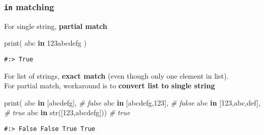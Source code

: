 \documentclass[
]{book}
\newenvironment{Shaded}{\begin{snugshade}}{\end{snugshade}}
\newcommand{\BuiltInTok}[1]{#1}
\newcommand{\CommentTok}[1]{\textcolor[rgb]{0.37,0.37,0.37}{\textit{#1}}}
\newcommand{\KeywordTok}[1]{\textcolor[rgb]{0.27,0.27,0.27}{\textbf{#1}}}
\newcommand{\NormalTok}[1]{#1}
\newcommand{\StringTok}[1]{\textcolor[rgb]{0.5,0.5,0.5}{#1}}
\begin{document}
\hypertarget{in-matching}{%
\subsubsection{\texorpdfstring{\texttt{in} matching}{in matching}}\label{in-matching}}

For single string, \textbf{partial match}

\begin{Shaded}
\begin{Highlighting}[]
\BuiltInTok{print}\NormalTok{( }\StringTok{\textquotesingle{}abc\textquotesingle{}} \KeywordTok{in} \StringTok{\textquotesingle{}123abcdefg\textquotesingle{}}\NormalTok{ )}
\end{Highlighting}
\end{Shaded}

\begin{verbatim}
#:> True
\end{verbatim}

For list of strings, \textbf{exact match} (even though only one element in list).\\
For partial match, workaround is to \textbf{convert list to single string}

\begin{Shaded}
\begin{Highlighting}[]
\BuiltInTok{print}\NormalTok{( }\StringTok{\textquotesingle{}abc\textquotesingle{}} \KeywordTok{in}\NormalTok{ [}\StringTok{\textquotesingle{}abcdefg\textquotesingle{}}\NormalTok{],             }\CommentTok{\# false}
       \StringTok{\textquotesingle{}abc\textquotesingle{}} \KeywordTok{in}\NormalTok{ [}\StringTok{\textquotesingle{}abcdefg\textquotesingle{}}\NormalTok{,}\StringTok{\textquotesingle{}123\textquotesingle{}}\NormalTok{],       }\CommentTok{\# fakse}
       \StringTok{\textquotesingle{}abc\textquotesingle{}} \KeywordTok{in}\NormalTok{ [}\StringTok{\textquotesingle{}123\textquotesingle{}}\NormalTok{,}\StringTok{\textquotesingle{}abc\textquotesingle{}}\NormalTok{,}\StringTok{\textquotesingle{}def\textquotesingle{}}\NormalTok{],     }\CommentTok{\# true}
       \StringTok{\textquotesingle{}abc\textquotesingle{}} \KeywordTok{in} \BuiltInTok{str}\NormalTok{([}\StringTok{\textquotesingle{}123\textquotesingle{}}\NormalTok{,}\StringTok{\textquotesingle{}abcdefg\textquotesingle{}}\NormalTok{]))  }\CommentTok{\# true}
\end{Highlighting}
\end{Shaded}

\begin{verbatim}
#:> False False True True
\end{verbatim}
\end{document}
